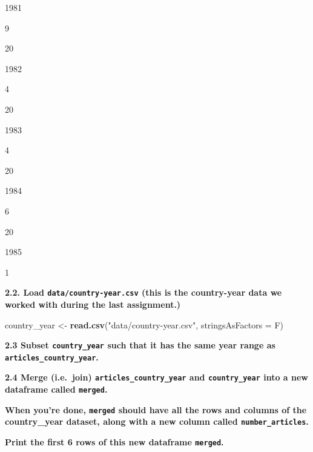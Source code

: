 \documentclass[]{book}
\newenvironment{Shaded}{\begin{snugshade}}{\end{snugshade}}
\newcommand{\CommentTok}[1]{\textcolor[rgb]{0.56,0.35,0.01}{\textit{#1}}}
\newcommand{\DataTypeTok}[1]{\textcolor[rgb]{0.13,0.29,0.53}{#1}}
\newcommand{\DecValTok}[1]{\textcolor[rgb]{0.00,0.00,0.81}{#1}}
\newcommand{\KeywordTok}[1]{\textcolor[rgb]{0.13,0.29,0.53}{\textbf{#1}}}
\newcommand{\NormalTok}[1]{#1}
\newcommand{\OperatorTok}[1]{\textcolor[rgb]{0.81,0.36,0.00}{\textbf{#1}}}
\newcommand{\StringTok}[1]{\textcolor[rgb]{0.31,0.60,0.02}{#1}}
\begin{document}
1981

9

20

1982

4

20

1983

4

20

1984

6

20

1985

1

\textbf{2.2. Load \texttt{data/country-year.csv} (this is the country-year data we worked with during the last assignment.)}

\begin{Shaded}
\begin{Highlighting}[]
\NormalTok{country_year <-}\StringTok{ }\KeywordTok{read.csv}\NormalTok{(}\StringTok{"data/country-year.csv"}\NormalTok{, }\DataTypeTok{stringsAsFactors =}\NormalTok{ F)}
\end{Highlighting}
\end{Shaded}

\textbf{2.3 Subset \texttt{country\_year} such that it has the same year range as \texttt{articles\_country\_year}.}

\begin{Shaded}
\end{Shaded}

\textbf{2.4 Merge (i.e.~join) \texttt{articles\_country\_year} and \texttt{country\_year} into a new dataframe called \texttt{merged}.}

\textbf{When you're done, \texttt{merged} should have all the rows and columns of the country\_year dataset, along with a new column called \texttt{number\_articles}.}

\textbf{Print the first 6 rows of this new dataframe \texttt{merged}.}

\begin{Shaded}
\end{Shaded}
\end{document}
